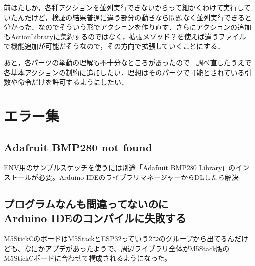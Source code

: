 \documentclass[fleqn,twocolumn]{mynote}
\begin{document}
  前はたしか，各種アクションを並列実行できないからって細かくわけて実行していたんだけど，検証の結果普通に違う部分の動きなら問題なく並列実行できると分かった．なのでそういう形でアクションを作り直す．さらにアクションの追加もActionLibraryに集約するのではなく，拡張メソッド？を使えば違うファイルで機能追加が可能だそうなので，その方向で拡張していくことにする．

  あと，各パーツの挙動の理解も不十分なところがあったので，調べ直したうえで各基本アクションの制約に追加したい．理想はそのパーツで可能とされている引数や命令だけを許可するようにしたい．

  \fboxsep=0pt            %
  \fboxrule=1pt            %
  \begin{figure}[h]
    \centering
    \caption{}
    \label{fig:}
  \end{figure}

  \section*{エラー集}
  \subsection*{Adafruit BMP280 not found}
  ENV用のサンプルスケッチを使うには別途「Adafruit BMP280 Library」のインストールが必要。Arduino
  IDEのライブラリマネージャーからDLしたら解決

  \subsection*{プログラムなんも間違ってないのに\\Arduino IDEのコンパイルに失敗する}
  M5StickCのボードはM5StackとESP32っていう2つのグループから出てるんだけども、なにかアプデがあったようで、周辺ライブラリ全体がM5Stack版のM5StickCボードに合わせて構成されるようになった。
\end{document}
